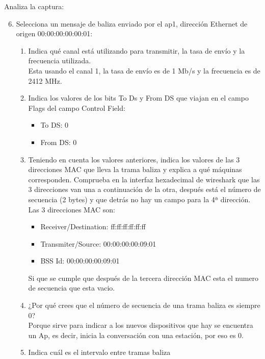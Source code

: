 \documentclass[12pt, a4paper]{report}
\begin{document}
Analiza la captura:
\begin{enumerate}
	\setcounter{enumi}{5}
	\item Selecciona un mensaje de baliza enviado por el ap1, dirección Ethernet de origen 00:00:00:00:00:01:
	\begin{enumerate}[label=\alph*)]
		\item Indica qué canal está utilizando para transmitir, la tasa de envío y la frecuencia utilizada.\\
		
		Esta usando el canal 1, la tasa de envío es de 1 Mb/s y la frecuencia es de 2412 MHz.
		\item Indica los valores de los bits To Ds y From DS que viajan en el campo Flags del campo
		Control Field:\\
		\begin{itemize}
			\item To DS: 0
			\item From DS: 0
		\end{itemize}
		\item Teniendo en cuenta los valores anteriores, indica los valores de las 3 direcciones MAC que
		lleva la trama baliza y explica a qué máquinas corresponden. Comprueba en la interfaz
		hexadecimal de wireshark que las 3 direcciones van una a continuación de la otra, después
		está el número de secuencia (2 bytes) y que detrás no hay un campo para la 4ª dirección.\\
		
		Las 3 direcciones MAC son:
		\begin{itemize}
			\item Receiver/Destination: ff:ff:ff:ff:ff:ff\\
			\item Transmiter/Source: 00:00:00:00:09:01\\
			\item BSS Id: 00:00:00:00:09:01 \\
		\end{itemize}
		Si que se cumple que después de la tercera dirección MAC esta el numero de secuencia que esta vacio.
		\item ¿Por qué crees que el número de secuencia de una trama baliza es siempre 0?\\
		
		Porque sirve para indicar a los nuevos dispositivos que hay se encuentra un Ap, es decir, inicia la conversación con una estación, por eso es 0.
		\item Indica cuál es el intervalo entre tramas baliza\\
		

\end{enumerate}
\end{enumerate}
\end{document}
